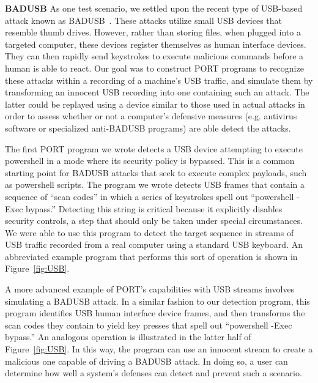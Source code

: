 \textbf{BADUSB} As one test scenario, we settled upon the recent type of USB-based attack known as BADUSB~\cite{badusb}.
These attacks utilize small USB devices that resemble thumb drives. However, rather than storing files, when plugged into a targeted computer, these devices register themselves as human interface devices. They can then rapidly send keystrokes to execute malicious commands before a human is able to react.
Our goal was to construct PORT programs to recognize these attacks within a recording of a machine’s USB traffic, and simulate them by transforming an innocent USB recording into one containing such an attack.
The latter could be replayed using a device similar to those used in actual attacks in order to assess whether or not a computer’s defensive measures (e.g. antivirus software or specialized anti-BADUSB programs) are able detect the attacks.

The first PORT program we wrote detects a USB device attempting to execute
powershell in a mode where its security policy is bypassed.
This is a common starting point for BADUSB attacks that seek to execute complex payloads, such as powershell scripts.
The program we wrote detects USB frames that contain a sequence of ``scan codes'' in which a series of keystrokes spell out ``powershell -Exec bypass.''
Detecting this string is critical because it explicitly disables security controls, a step that should only be taken under special circumstances.
We were able to use this program to detect the target sequence in streams of USB traffic recorded from a real computer using a standard USB keyboard.  An abbreviated example program that performs this sort of operation is shown in Figure~\ref{fig:USB}.

A more advanced example of PORT's capabilities with USB streams involves simulating a BADUSB attack.
In a similar fashion to our detection program, this program identifies USB human interface device frames, and then transforms the scan codes they contain to yield key presses that spell out ``powershell -Exec bypass.''
An analogous operation is illustrated in the latter half of Figure~\ref{fig:USB}.
In this way, the program can use an innocent stream to create a malicious one capable of driving a BADUSB attack. In doing so, a user can determine how well a system's defenses can detect and prevent such a scenario.

